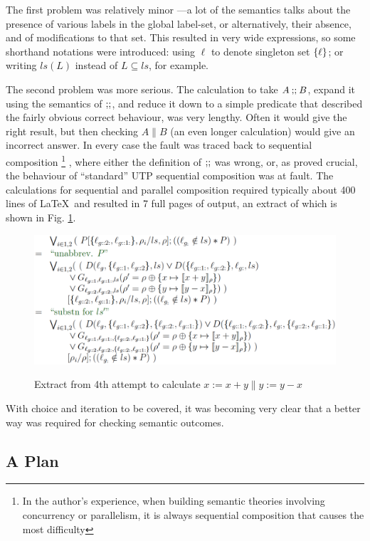 The first problem was relatively minor
---a lot of the semantics talks about the presence of various
labels in the global label-set, or alternatively, their  absence,
and of modifications to that set.
This resulted in very wide expressions,
so some shorthand notations were introduced:
using $\ell$ to denote singleton set $\{{\ell}\}$;
or writing $ls(L)$ instead of $L \subseteq ls$, for example.

The second problem was more serious.
The calculation to take $A \mathbin{\mathbf{;\!;}} B$,
expand it using the semantics of $\mathbin{\mathbf{;\!;}}$,
and reduce it down to a simple predicate that described the fairly obvious
correct behaviour,
was very lengthy.
Often it would give the right result,
but then checking $A \parallel B$ (an even longer calculation)
would give an incorrect answer.
In every case the fault was traced back to sequential composition%
\footnote{
In the author's experience,
when building semantic theories involving concurrency or parallelism,
it is always sequential composition that causes the most difficulty
}
,
where either the definition of $\mathbin{\mathbf{;\!;}}$ was wrong,
or, as proved crucial,
the behaviour of ``standard'' UTP sequential composition
was at fault.
The calculations for sequential and parallel composition
required typically about 400 lines of \LaTeX\ and resulted
in 7 full pages of output,
an extract of which is shown in Fig. \ref{fig:attempt4}.

\begin{figure}
  \centering
  \includegraphics[width=4.5in]{Attempt4.eps}\\
  \caption{Extract from 4th attempt to calculate $x:=x+y \parallel y:=y-x$}
  \label{fig:attempt4}
\end{figure}

With choice and iteration to be covered,
it was becoming very clear that a better way was required
for checking semantic outcomes.

\subsection{A Plan}\label{ssec:plan}

